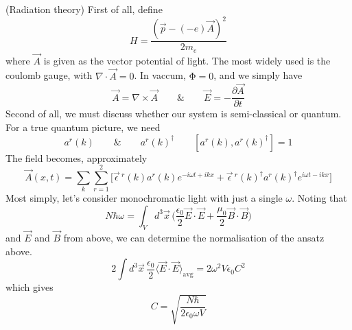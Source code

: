\begin{thm}
(Radiation theory) First of all, define
\[H=\dfrac{(\vec{p}-(-e)\vec{A})^2}{2m_{e}}\]
where $\vec{A}$ is given as the vector potential of light. The most widely used is the coulomb gauge, with $\nabla \cdot \vec{A}=0$. In vaccum, $\mathrm{\Phi} =0$, and we simply have
\[\vec{A}=\nabla \times \vec{A}\qquad\&\qquad \vec{E}=-\dfrac{\partial \vec{A}}{\partial t} \]
Second of all, we must discuss whether our system is semi-classical or quantum. For a true quantum picture, we need 
\[a^{r}(k)\qquad\&\qquad a^{r}(k)^{\dagger }\qquad [a^{r}(k),a^{r}(k)^{\dagger }]=1\]
The field becomes, approximately
\[\vec{A}(x,t)=\sum _{k}\sum _{r=1}^{2}\Big[\vec{\epsilon }\,^{r}(k)a^{r}(k)e^{-i\omega t+ikx}+\vec{\epsilon }\,^{r}(k)^{\dagger }a^{r}(k)^{\dagger }e^{i\omega t-ikx}\Big]\]
Most simply, let's consider monochromatic light with just a single $\omega $. Noting that
\[N\hbar \omega =\int_{V} d^3\vec{x}\,\Big(\dfrac{\epsilon_0}{2}\vec{E}\cdot \vec{E}+\dfrac{\mu_0}{2}\vec{B}\cdot \vec{B}\Big)\]
and $\vec{E}$ and $\vec{B}$ from above, we can determine the normalisation of the ansatz above.
\[2\int d^3\vec{x}\,\dfrac{\epsilon_0}{2}\langle \vec{E}\cdot \vec{E}\rangle _{\mathrm{avg}}=2\omega ^2V\epsilon_0C^2\]
which gives
\[C=\sqrt{\dfrac{N\hbar  }{2\epsilon_0\omega V}}\]
\end{thm}
\vspace{2ex}

